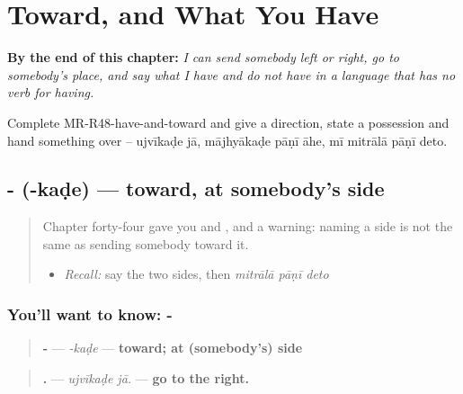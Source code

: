
\chapter{Toward, and What You Have}
\label{ch:mr-kade-and-have}

\begin{chapteropening}
\textbf{By the end of this chapter:} \emph{I can send somebody left or right, go to somebody's place, and say what I have and do not have in a language that has no verb for having.}

Complete MR-R48-have-and-toward and give a direction, state a possession and hand something over -- ujvīkaḍe jā, mājhyākaḍe pāṇī āhe, mī mitrālā pāṇī deto.
\end{chapteropening}

\section[\texorpdfstring{-\mr{कडे} (-kaḍe)}{-कडे (-kaḍe)}]{- (-kaḍe) — toward, at somebody's side}

\label{lesson:MR-C48-kade}



\begin{quote}
Chapter forty-four gave you \textbf{} and \textbf{}, and a warning: naming a side is not the same as sending somebody toward it.

\begin{itemize}
\raggedright
  \item \emph{Recall:} say the two sides, then \emph{mitrālā pāṇī deto}
\end{itemize}
\end{quote}

\subsection*{You'll want to know: -}
\begin{quote}
\textbf{-} — \emph{-kaḍe} — \textbf{toward; at (somebody's) side}
\end{quote}

\begin{quote}
\textbf{ .} — \emph{ujvīkaḍe jā.} — \textbf{go to the right.}
\end{quote}


